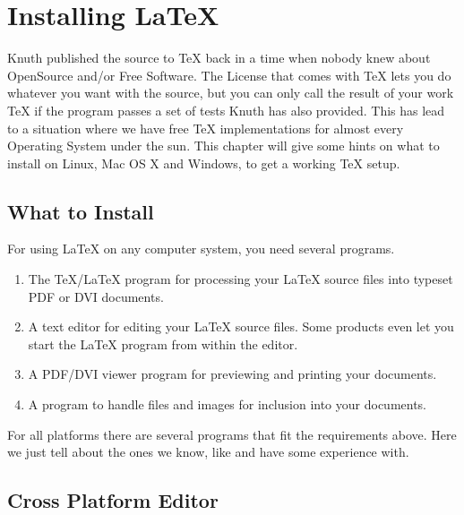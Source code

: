 \appendix
\chapter{Installing \LaTeX}
\begin{intro}
Knuth published the source to \TeX{} back in a time when nobody knew
about OpenSource and/or Free Software. The License that comes with \TeX{}
lets you do whatever you want with the source, but you can only call the
result of your work \TeX{} if the program passes a set of tests Knuth has
also provided. This has lead to a situation where we have free \TeX{}
implementations for almost every Operating System under the sun. This chapter
will give some hints on what to install on Linux, Mac OS X and Windows, to
get a working \TeX{} setup.
\end{intro}

\section{What to Install}

For using \LaTeX{} on any computer system, you need several programs.

\begin{enumerate}

\item The \TeX{}/\LaTeX{} program for processing your \LaTeX{} source files
into typeset PDF or DVI documents.

\item A text editor for editing your \LaTeX{} source files. Some products even let
you start the \LaTeX{} program from within the editor.

\item A PDF/DVI viewer program for previewing and printing your
documents.

\item A program to handle \PSi{} files and images for inclusion into
your documents.

\end{enumerate}

For all platforms there are several programs that fit the requirements above.
Here we just tell about the ones we know, like and have some experience
with.

\section{Cross Platform Editor}
\label{sec:texmaker}


